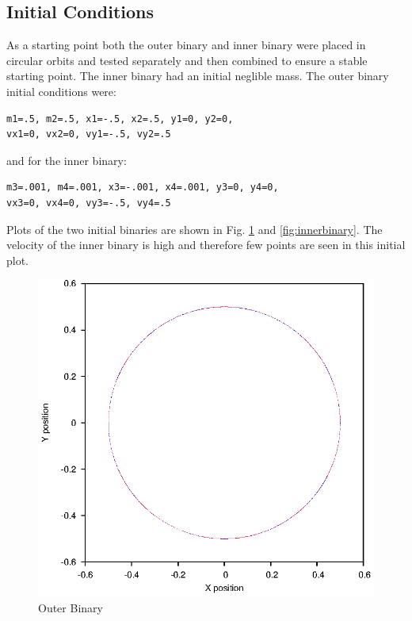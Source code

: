 \documentclass[a4paper,12pt]{article}
\begin{document}
\subsection{Initial Conditions}
As a starting point both the outer binary and inner binary were placed in circular orbits and tested separately and then combined to ensure a stable
starting point. The inner binary had an initial neglible mass.
The outer binary initial conditions were:
\begin{lstlisting}
m1=.5, m2=.5, x1=-.5, x2=.5, y1=0, y2=0,
vx1=0, vx2=0, vy1=-.5, vy2=.5
\end{lstlisting}
and for the inner binary:
\begin{lstlisting}
m3=.001, m4=.001, x3=-.001, x4=.001, y3=0, y4=0, 
vx3=0, vx4=0, vy3=-.5, vy4=.5
\end{lstlisting}
Plots of the two initial binaries are shown in Fig. \ref{fig:outerbinary} and 
\ref{fig:innerbinary}. The velocity of the inner binary is high and therefore few points are seen in this initial plot.
\begin{figure}[H]
\centering
\includegraphics[width=.9\textwidth]{./2016results/outerbinary/Orbit.eps}
\caption{Outer Binary}
\label{fig:outerbinary}
\end{figure}
\end{document}
